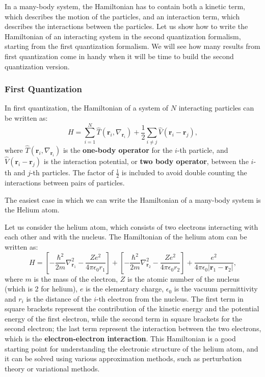 In a many-body system, the Hamiltonian has to contain both a kinetic term, which describes the motion of the particles, and an interaction term, which describes the interactions between the particles. Let us show how to write the Hamiltonian of an interacting system in the second quantization formalism, starting from the first quantization formalism. We will see how many results from first quantization come in handy when it will be time to build the second quantization version.

\subsubsection{First Quantization}

In first quantization, the Hamiltonian of a system of \(N\) interacting particles can be written as:
\[
    H = \sum_{i=1}^N \hat{T}(\mathbf{r}_i, \nabla_{\mathbf{r}_i}) + \frac{1}{2} \sum_{i \neq j} \hat{V}(\mathbf{r}_i - \mathbf{r}_j),
\]
where \(\hat{T}(\mathbf{r}_i, \nabla_{\mathbf{r}_i})\) is the \textbf{one-body operator} for the \(i\)-th particle, and \(\hat{V}(\mathbf{r}_i - \mathbf{r}_j)\) is the interaction potential, or \textbf{two body operator}, between the \(i\)-th and \(j\)-th particles. The factor of \(\frac{1}{2}\) is included to avoid double counting the interactions between pairs of particles.

The easiest case in which we can write the Hamiltonian of a many-body system is the Helium atom.

\begin{example}
    Let us consider the helium atom, which consists of two electrons interacting with each other and with the nucleus. The Hamiltonian of the helium atom can be written as:
    \[
        H = \left[ -\frac{\hbar^2}{2m} \nabla_{\mathbf{r}_1}^2 - \frac{Ze^2}{4\pi \epsilon_0 r_1} \right] + \left[ - \frac{\hbar^2}{2m} \nabla_{\mathbf{r}_2}^2 - \frac{Ze^2}{4\pi \epsilon_0 r_2}\right] + \frac{e^2}{4\pi \epsilon_0 \vert \mathbf{r}_1 - \mathbf{r}_2 \vert },
    \]
    where \(m\) is the mass of the electron, \(Z\) is the atomic number of the nucleus (which is 2 for helium), \(e\) is the elementary charge, \(\epsilon_0\) is the vacuum permittivity and \(r_i\) is the distance of the \(i\)-th electron from the nucleus. The first term in square brackets represent the contribution of the kinetic energy and the potential energy of the first electron, while the second term in square brackets for the second electron; the last term represent the interaction between the two electrons, which is the \textbf{electron-electron interaction}. This Hamiltonian is a good starting point for understanding the electronic structure of the helium atom, and it can be solved using various approximation methods, such as perturbation theory or variational methods.
\end{example}

